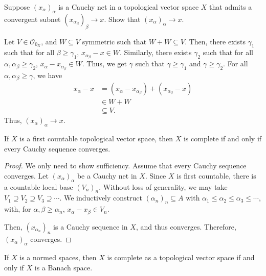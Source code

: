 \documentclass[10pt]{mypackage}
\begin{document}
\begin{exercise}
  Suppose $\left(x_{\alpha}\right)_{\alpha}$ is a Cauchy net in a topological vector space $X$ that admits a convergent subnet $\left(x_{\alpha_{\beta}}\right)_{\beta}\rightarrow x$. Show that $\left(x_{\alpha}\right)_{\alpha}\rightarrow x$.
\end{exercise}
\begin{solution}
  Let $V\in \mathcal{O}_{0_X}$, and $W\subseteq V$ symmetric such that $W+W \subseteq V$. Then, there exists $\gamma_1$ such that for all $\beta \geq \gamma_1$, $x_{\alpha_{\beta}}- x \in W$. Similarly, there exists $\gamma_2$ such that for all $\alpha,\alpha_{\beta}\geq \gamma_2$, $x_{\alpha}-x_{\alpha_{\beta}} \in W$. Thus, we get $\gamma$ such that $\gamma \geq \gamma_1$ and $\gamma \geq \gamma_{2}$. For all $\alpha,\alpha_{\beta} \geq \gamma$, we have
  \begin{align*}
    x_{\alpha} - x &= \left(x_{\alpha} - x_{\alpha_{\beta}}\right) + \left(x_{\alpha_{\beta}} - x\right)\\
                   &\in W + W\\
                   &\subseteq V.
  \end{align*}
  Thus, $\left(x_{\alpha}\right)_{\alpha}\rightarrow x$.
\end{solution}
\begin{proposition}
  If $X$ is a first countable topological vector space, then $X$ is complete if and only if every Cauchy sequence converges.
\end{proposition}
\begin{proof}
  We only need to show sufficiency. Assume that every Cauchy sequence converges. Let $\left(x_{\alpha}\right)_{\alpha}$ be a Cauchy net in $X$. Since $X$ is first countable, there is a countable local base $\left(V_{n}\right)_n$. Without loss of generality, we may take $V_1\supseteq V_2\supseteq V_3\supseteq \cdots$. We inductively construct $\left(\alpha_{n}\right)_{n}\subseteq A$ with $\alpha_{1}\leq \alpha_{2}\leq \alpha_{3}\leq \cdots$, with, for $\alpha,\beta \geq \alpha_{n}$, $x_{\alpha} - x_{\beta}\in V_{n}$.\newline

  Then, $\left(x_{\alpha_{n}}\right)_{n}$ is a Cauchy sequence in $X$, and thus converges. Therefore, $\left(x_{\alpha}\right)_{\alpha}$ converges.
\end{proof}
\begin{corollary}
  If $X$ is a normed spaces, then $X$ is complete as a topological vector space if and only if $X$ is a Banach space.
\end{corollary}
\end{document}
